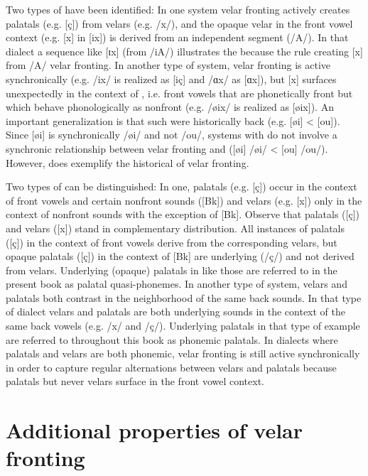 Two types of  have been identified: In one system velar fronting actively creates palatals (e.g. [ç]) from velars (e.g. /x/), and the opaque velar in the front vowel context (e.g. [x] in [ix]) is derived from an independent segment (/A/). In that dialect a sequence like [ɪx] (from /iA/) illustrates the  because the rule creating [x] from /A/  velar fronting. In another type of system, velar fronting is active synchronically (e.g. /ix/ is realized as [iç] and /ɑx/ as [ɑx]), but [x] surfaces unexpectedly in the context of , i.e. front vowels that are phonetically front but which behave phonologically as nonfront (e.g. /øix/ is realized as [øix]). An important generalization is that such  were historically back (e.g. [øi] < [ou]). Since [øi] is synchronically /øi/ and not /ou/, systems with  do not involve a synchronic  relationship between velar fronting and  ([øi] /øi/ < [ou] /ou/). However,  does exemplify the historical  of velar fronting.

Two types of  can be distinguished: In one, palatals (e.g. [ç]) occur in the context of front vowels and certain nonfront sounds ([Bk]) and velars (e.g. [x]) only in the context of  nonfront sounds with the exception of [Bk]. Observe that palatals ([ç]) and velars ([x]) stand in complementary distribution. All instances of palatals ([ç]) in the context of front vowels derive from the corresponding velars, but opaque palatals ([ç]) in the context of [Bk] are underlying (/ç/) and not derived from velars. Underlying (opaque) palatals in like those are referred to in the present book as palatal quasi-phonemes. In another type of system, velars and palatals both contrast in the neighborhood of the same back sounds. In that type of dialect velars and palatals are both underlying sounds in the context of the same back vowels (e.g. /x/ and /ç/). Underlying palatals in that type of example are referred to throughout this book as phonemic palatals. In dialects where palatals and velars are both phonemic, velar fronting is still active synchronically in order to capture regular alternations between velars and palatals because palatals but never velars surface in the front vowel context.

\section{{Additional} {properties} {of} {velar} {fronting}}\label{sec:18.2}

